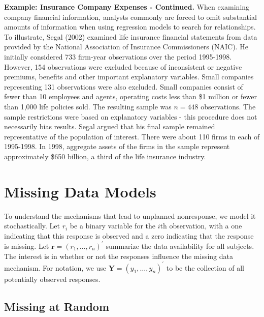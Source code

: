 \linejed{}

\textbf{Example: Insurance Company Expenses - Continued.} When
examining company financial information, analysts commonly are
forced to omit substantial amounts of information when using
regression models to search for relationships. To illustrate, Segal
(2002) examined life insurance financial statements from data
provided by the National Association of Insurance Commissioners
(NAIC). He initially considered 733 firm-year observations over the
period 1995-1998. However, 154 observations were excluded because of
inconsistent or negative premiums, benefits and other important
explanatory variables. Small companies representing 131 observations
were also excluded. Small companies consist of fewer than 10
employees and agents, operating costs less than \$1 million or fewer
than 1,000 life policies sold. The resulting sample was $n=448$
observations. The sample restrictions were based on explanatory
variables - this procedure does not necessarily bias results. Segal
argued that his final sample remained representative of the
population of interest. There were about 110 firms in each of
1995-1998. In 1998, aggregate assets of the firms in the sample
represent approximately \$650 billion, a third of the life insurance
industry.

\linejed


\section{Missing Data Models}

To understand the mechanisms that lead to unplanned nonresponse, we
model it stochastically. Let $r_i$ be a binary variable for the
$i$th observation, with a one indicating that this response is
observed and a zero indicating that the response is missing. Let
$\mathbf{r} = (r_1, \ldots, r_n)^{\prime}$  summarize the data
availability for all subjects. The interest is in whether or not the
responses influence the missing data mechanism. For notation, we use
$\mathbf{Y} = (y_1, \ldots, y_n)^{\prime}$  to be the collection of
all potentially observed responses.

\subsection{Missing at Random}

